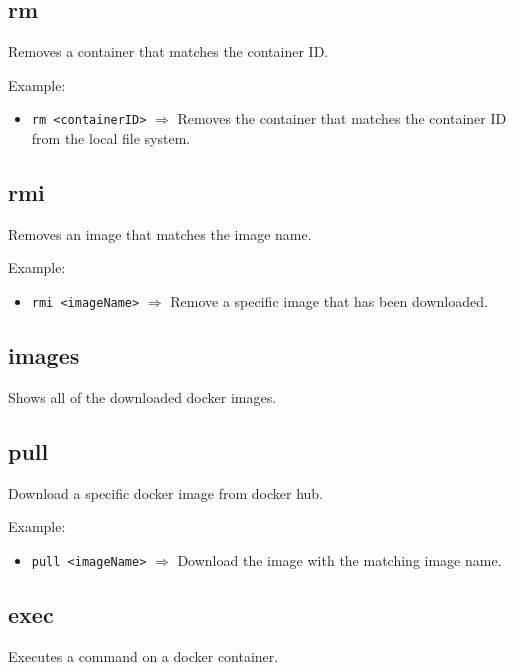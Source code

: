 \documentclass[a4paper, 12pt]{article}
\begin{document}
\subsection{rm}

Removes a container that matches the container ID.

\vspace{0.5em}
Example:
\begin{itemize}
	\item \texttt{rm <containerID>} $\Rightarrow$ Removes the container that matches the
	container ID from the local file system.
\end{itemize}

\subsection{rmi}

Removes an image that matches the image name.

\vspace{0.5em}
Example:
\begin{itemize}
	\item \texttt{rmi <imageName>} $\Rightarrow$ Remove a specific image that has been
	downloaded.
\end{itemize}

\subsection{images}

Shows all of the downloaded docker images.

\subsection{pull}

Download a specific docker image from docker hub.

\vspace{0.5em}
Example:
\begin{itemize}
	\item \texttt{pull <imageName>} $\Rightarrow$ Download the image with the matching image
	name.
\end{itemize}

\subsection{exec}

Executes a command on a docker container.
\end{document}
